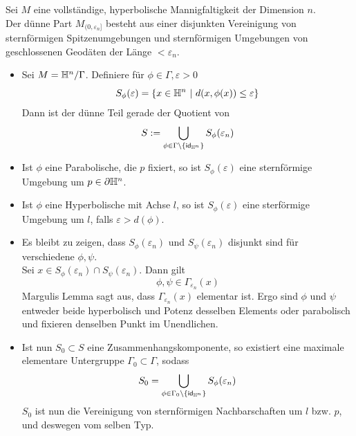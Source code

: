 \documentclass{book}
\renewcommand{\epsilon}{\varepsilon}
\newcommand{\thin}{M_{(0,\epsilon_n]}}
\begin{document}
Sei $M$ eine vollständige, hyperbolische Mannigfaltigkeit der Dimension $n$.\\
Der dünne Part $\thin$ besteht aus einer disjunkten Vereinigung von sternförmigen Spitzenumgebungen und sternförmigen Umgebungen von geschlossenen Geodäten der Länge $< \epsilon_n$.
\begin{Beweis}{}
	\begin{itemize}
		\item Sei $M = \mathbb{H}^n / \Gamma$. Definiere für $\phi \in \Gamma, \epsilon > 0$
		\[ S_\phi(\epsilon) = \set{x \in \H^n}{d(x, \phi(x)) \leq \epsilon} \]
		Dann ist der dünne Teil gerade der Quotient von
		\[ S := \bigcup_{\phi \in \Gamma\setminus\{\id{\H^n}\}} S_\phi(\epsilon_n)  \]
		\item Ist $\phi$ eine Parabolische, die $p$ fixiert, so ist $S_\phi(\epsilon)$ eine sternförmige Umgebung um $p\in\partial \mathbb{H}^n$.
		\item Ist $\phi$ eine Hyperbolische mit Achse $l$, so ist $S_\phi(\epsilon)$ eine sterförmige Umgebung um $l$, falls $\epsilon > d(\phi)$.
		\item Es bleibt zu zeigen, dass $S_\phi(\epsilon_n)$ und $S_\psi(\epsilon_n)$ disjunkt sind für verschiedene $\phi, \psi$.\\
		Sei $x \in S_\phi(\epsilon_n)\cap S_\psi(\epsilon_n)$. Dann gilt
		\[ \phi, \psi \in \Gamma_{\epsilon_n}(x) \]
		Margulis Lemma sagt aus, dass $\Gamma_{\epsilon_n}(x)$ elementar ist. Ergo sind $\phi$ und $\psi$ entweder beide hyperbolisch und Potenz desselben Elements oder parabolisch und fixieren denselben Punkt im Unendlichen.
		\item Ist nun $S_0 \subset S$ eine Zusammenhangskomponente, so existiert eine maximale elementare Untergruppe $\Gamma_0 \subset \Gamma$, sodass
		\[S_0 = \bigcup_{\phi \in \Gamma_0\setminus \{ \id{\H^n}\}} S_\phi(\epsilon_n) \]
		$S_0$ ist nun die Vereinigung von sternförmigen Nachbarschaften um $l$ bzw. $p$, und deswegen vom selben Typ. 
	\end{itemize}
\end{Beweis}
\end{document}
